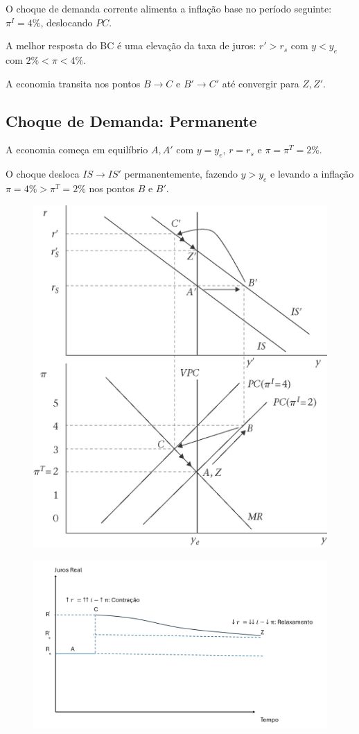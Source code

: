 \documentclass[a4paper,12pt]{article}[abntex2]
\begin{document}
O choque de demanda corrente alimenta a inflação base no período seguinte: \( \pi^I = 4\% \), deslocando \( PC \).

A melhor resposta do BC é uma elevação da taxa de juros: \( r' > r_s \) com \( y < y_e \) com \( 2\% < \pi < 4\% \).

A economia transita nos pontos \( B \to C \) e \( B' \to C' \) até convergir para \( Z, Z' \).

\subsection{\textbf{Choque de Demanda: Permanente}}

A economia começa em equilíbrio \( A, A' \) com \( y = y_e \), \( r = r_s \) e \( \pi = \pi^T = 2\% \).

O choque desloca \( IS \to IS' \) permanentemente, fazendo \( y > y_e \) e levando a inflação \( \pi = 4\% > \pi^T = 2\% \) nos pontos \( B \) e \( B' \).

\begin{figure}[H]
    \centering
    \includegraphics[width=0.5\linewidth]{Imagens/a13i3.png}
\end{figure}

\begin{figure}[H]
    \centering
    \includegraphics[width=0.7\linewidth]{Imagens/a13i7.png}
\end{figure}
\end{document}
